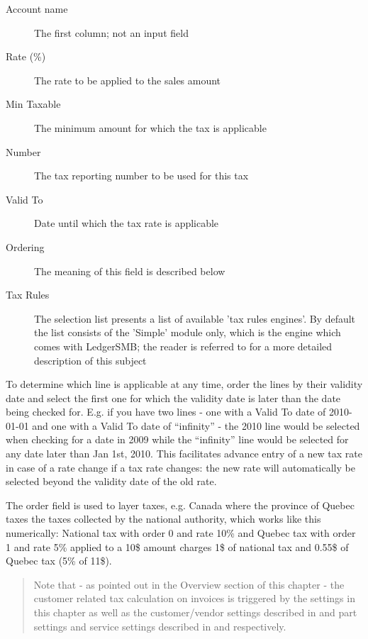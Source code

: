 \begin{description}
\item [Account name] The first column; not an input field
\item [Rate (\%)] The rate to be applied to the sales amount
\item [Min Taxable] The minimum amount for which the tax is applicable
\item [Number] The tax reporting number to be used for this tax
\item [Valid To] Date until which the tax rate is applicable
\item [Ordering] The meaning of this field is described below
\item [Tax Rules] The selection list presents a list of available 'tax rules engines'. By
   default the list consists of the 'Simple' module only, which is the engine which comes
   with LedgerSMB; the reader is referred to  for a more detailed
   description of this subject
\end{description}

To determine which line is applicable at any time, order the lines by their validity date and
select the first one for which the validity date is later than the date being checked for. E.g.
if you have two lines - one with a Valid To date of 2010-01-01 and one with a Valid To date of
``infinity'' - the 2010 line would be selected when checking for a date in 2009 while the ``infinity''
line would be selected for any date later than Jan 1st, 2010. This facilitates advance entry of a new
tax rate in case of a rate change if a tax rate changes: the new rate will automatically be selected
beyond the validity date of the old rate.

The order field is used to layer taxes, e.g. Canada where the province of Quebec taxes
the taxes collected by the national authority, which works like this numerically:
National tax with order 0 and rate 10\% and Quebec tax with order 1 and rate 5\%
applied to a 10\$ amount charges 1\$ of national tax and 0.55\$ of Quebec tax (5\% of 11\$).

\begin{quotation}
Note that - as pointed out in the Overview section of this chapter - the customer related
tax calculation on invoices is triggered by the settings in this chapter as well as
the customer/vendor settings described in 
and part settings and service settings described in  and
 respectively.
\end{quotation}

